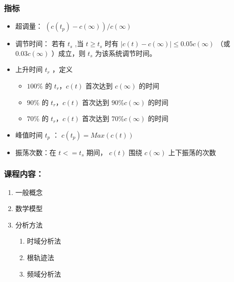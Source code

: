 \documentclass{beamer}
\begin{document}
\begin{frame}
\frametitle{指标}
\label{sec-2-3}

\begin{itemize}
\item 超调量：  $(c(t_p)-c(\infty))/c(\infty)$
\item 调节时间： 若有 $t_s$ ,当 $t\geq t_s$ 时有 $|c(t)-c(\infty)|\leq 0.05c(\infty)$ （或 $0.03c(\infty)$ ）成立，则 $t_s$ 为该系统调节时间。
\item 上升时间 $t_r$ ，定义
\begin{itemize}
\item $100\%$ 的 $t_r，c(t)$ 首次达到 $c(\infty)$ 的时间
\item $90\%$ 的 $t_r，c(t)$ 首次达到 $90\%c(\infty)$ 的时间
\item $70\%$ 的 $t_r，c(t)$ 首次达到 $70\%c(\infty)$ 的时间
\end{itemize}
\item 峰值时间 $t_p$ ： $c(t_p)=Max(c(t))$
\item 振荡次数：在 $t<=t_s$ 期间， $c(t)$ 围绕 $c(\infty)$ 上下振荡的次数
\end{itemize}
\end{frame}
\begin{frame}
\frametitle{课程内容：}
\label{sec-2-4}

\begin{enumerate}
\item <2->一般概念
\item <3->数学模型
\item <4->分析方法
\begin{enumerate}
\item 时域分析法
\item 根轨迹法
\item 频域分析法
\end{enumerate}
\end{enumerate}
\end{frame}
\end{document}
